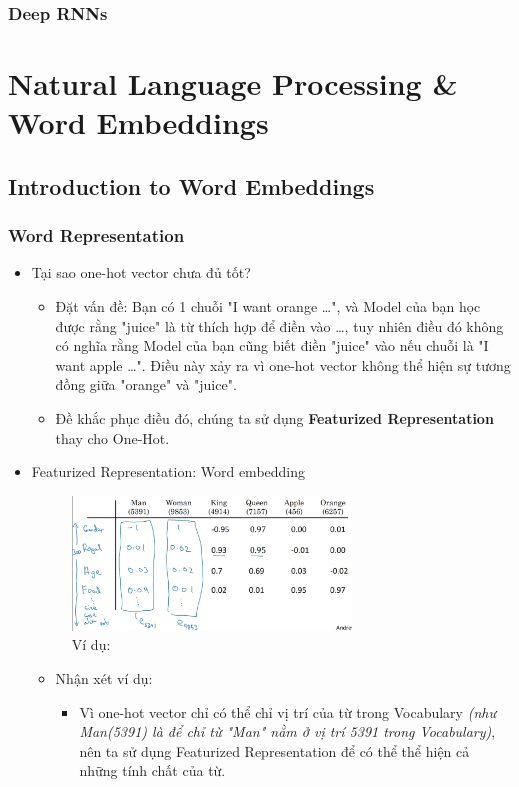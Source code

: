 \documentclass[12pt,a4paper]{report}
\begin{document}
		\subsection{Deep RNNs}
\chapter{Natural Language Processing \& Word Embeddings}
	\section{Introduction to Word Embeddings}
		\subsection{Word Representation}
			\begin{itemize}
			\item Tại sao one-hot vector chưa đủ tốt?
				\begin{itemize}
				\item Đặt vấn đề: Bạn có 1 chuỗi "I want orange \dots", và Model của bạn học được rằng "juice" là từ thích hợp để điền vào \dots, tuy nhiên điều đó không có nghĩa rằng Model của bạn cũng biết điền "juice" vào nếu chuỗi là "I want apple \dots". Điều này xảy ra vì one-hot vector không thể hiện sự tương đồng giữa "orange" và "juice".
				\item Đề khắc phục điều đó, chúng ta sử dụng \textbf{Featurized Representation} thay cho One-Hot.
				\end{itemize}
			\item Featurized Representation: Word embedding
				\begin{figure}[h]
					\caption{Ví dụ:}
					\centering
					\includegraphics[width=0.7\textwidth]{2}
				\end{figure}
				\begin{itemize}
				\item Nhận xét ví dụ:
					\begin{itemize}
					\item Vì one-hot vector chỉ có thể chỉ vị trí của từ trong Vocabulary \textit{(như Man(5391) là để chỉ từ "Man" nằm ở vị trí 5391 trong Vocabulary)}, nên ta sử dụng Featurized Representation để có thể thể hiện cả những tính chất của từ.

\end{itemize}
\end{itemize}
\end{itemize}
\end{document}
